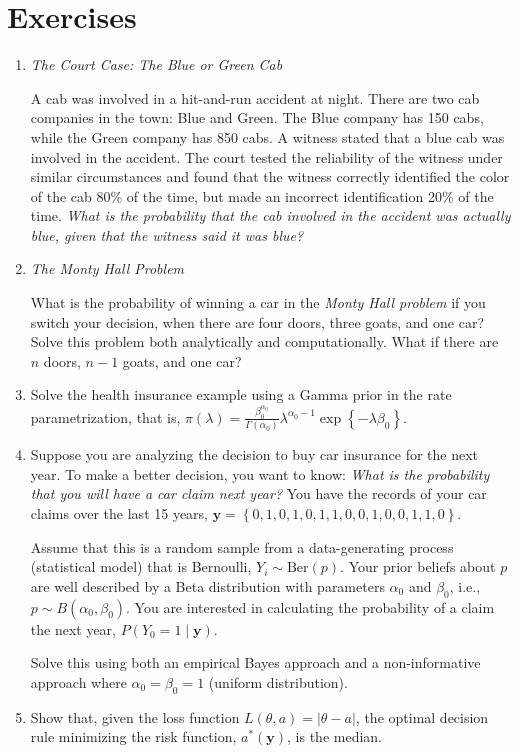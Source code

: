 \section{Exercises}

\begin{enumerate}
	\item \textit{The Court Case: The Blue or Green Cab}
	
	A cab was involved in a hit-and-run accident at night. There are two cab companies in the town: Blue and Green. The Blue company has 150 cabs, while the Green company has 850 cabs. A witness stated that a blue cab was involved in the accident. The court tested the reliability of the witness under similar circumstances and found that the witness correctly identified the color of the cab 80\% of the time, but made an incorrect identification 20\% of the time. \textit{What is the probability that the cab involved in the accident was actually blue, given that the witness said it was blue?}
	
	\item \textit{The Monty Hall Problem}
	
	What is the probability of winning a car in the \textit{Monty Hall problem} if you switch your decision, when there are four doors, three goats, and one car? Solve this problem both analytically and computationally. What if there are $n$ doors, $n-1$ goats, and one car?
	
	\item Solve the health insurance example using a Gamma prior in the rate parametrization, that is, $\pi(\lambda) = \frac{\beta_0^{\alpha_0}}{\Gamma(\alpha_0)} \lambda^{\alpha_0 - 1} \exp\left\{-\lambda \beta_0\right\}$.
	
	\item Suppose you are analyzing the decision to buy car insurance for the next year. To make a better decision, you want to know: \textit{What is the probability that you will have a car claim next year?} You have the records of your car claims over the last 15 years, $\mathbf{y} = \left\{ 0, 1, 0, 1, 0, 1, 1, 0, 0, 1, 0, 0, 1, 1, 0 \right\}$.
	
	Assume that this is a random sample from a data-generating process (statistical model) that is Bernoulli, $Y_i \sim \text{Ber}(p)$. Your prior beliefs about $p$ are well described by a Beta distribution with parameters $\alpha_0$ and $\beta_0$, i.e., $p \sim B(\alpha_0, \beta_0)$. You are interested in calculating the probability of a claim the next year, $P(Y_0 = 1 \mid \mathbf{y})$.
	
	Solve this using both an empirical Bayes approach and a non-informative approach where $\alpha_0 = \beta_0 = 1$ (uniform distribution).
	
	\item Show that, given the loss function $L(\theta, a) = |\theta - a|$, the optimal decision rule minimizing the risk function, $a^*(\mathbf{y})$, is the median.
	
\end{enumerate}



